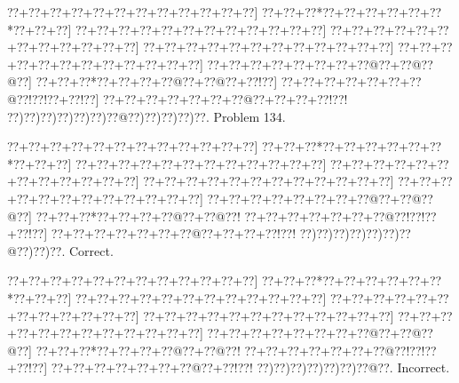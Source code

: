 \documentclass[a5paper]{article}
\begin{document}
\begin{center}
{\goo
\0??+\0??+\0??+\0??+\0??+\0??+\0??+\0??+\0??+\0??+\0??+\0??]
\0??+\0??+\0??*\0??+\0??+\0??+\0??+\0??+\0??*\0??+\0??+\0??]
\0??+\0??+\0??+\0??+\0??+\0??+\0??+\0??+\0??+\0??+\0??+\0??]
\0??+\0??+\0??+\0??+\0??+\0??+\0??+\0??+\0??+\0??+\0??+\0??]
\0??+\0??+\0??+\0??+\0??+\0??+\0??+\0??+\0??+\0??+\0??+\0??]
\0??+\0??+\0??+\0??+\0??+\0??+\0??+\0??+\0??+\0??+\0??+\0??]
\0??+\0??+\0??+\0??+\0??+\0??+\0??+\0??@\0??+\0??@\0??@\0??]
\0??+\0??+\0??*\0??+\0??+\0??+\0??@\0??+\0??@\0??+\0??!\0??]
\0??+\0??+\0??+\0??+\0??+\0??+\0??@\0??!\0??!\0??+\0??!\0??]
\0??+\0??+\0??+\0??+\0??+\0??+\0??@\0??+\0??+\0??+\0??!\0??!
\0??)\0??)\0??)\0??)\0??)\0??)\0??@\0??)\0??)\0??)\0??)\0??.
}
Problem 134.

\end{center}
\begin{center}
{\goo
\0??+\0??+\0??+\0??+\0??+\0??+\0??+\0??+\0??+\0??+\0??+\0??]
\0??+\0??+\0??*\0??+\0??+\0??+\0??+\0??+\0??*\0??+\0??+\0??]
\0??+\0??+\0??+\0??+\0??+\0??+\0??+\0??+\0??+\0??+\0??+\0??]
\0??+\0??+\0??+\0??+\0??+\0??+\0??+\0??+\0??+\0??+\0??+\0??]
\0??+\0??+\0??+\0??+\0??+\0??+\0??+\0??+\0??+\0??+\0??+\0??]
\0??+\0??+\0??+\0??+\0??+\0??+\0??+\0??+\0??+\0??+\0??+\0??]
\0??+\0??+\0??+\0??+\0??+\0??+\0??+\0??@\0??+\0??@\0??@\0??]
\0??+\0??+\0??*\0??+\0??+\0??+\0??@\0??+\0??@\0??!
\0??+\0??+\0??+\0??+\0??+\0??+\0??@\0??!\0??!\0??+\0??!\0??]
\0??+\0??+\0??+\0??+\0??+\0??+\0??@\0??+\0??+\0??+\0??!\0??!
\0??)\0??)\0??)\0??)\0??)\0??)\0??@\0??)\0??)\0??.
}
Correct. 

\end{center}
\begin{center}
{\goo
\0??+\0??+\0??+\0??+\0??+\0??+\0??+\0??+\0??+\0??+\0??+\0??]
\0??+\0??+\0??*\0??+\0??+\0??+\0??+\0??+\0??*\0??+\0??+\0??]
\0??+\0??+\0??+\0??+\0??+\0??+\0??+\0??+\0??+\0??+\0??+\0??]
\0??+\0??+\0??+\0??+\0??+\0??+\0??+\0??+\0??+\0??+\0??+\0??]
\0??+\0??+\0??+\0??+\0??+\0??+\0??+\0??+\0??+\0??+\0??+\0??]
\0??+\0??+\0??+\0??+\0??+\0??+\0??+\0??+\0??+\0??+\0??+\0??]
\0??+\0??+\0??+\0??+\0??+\0??+\0??+\0??@\0??+\0??@\0??@\0??]
\0??+\0??+\0??*\0??+\0??+\0??+\0??@\0??+\0??@\0??!
\0??+\0??+\0??+\0??+\0??+\0??+\0??@\0??!\0??!\0??+\0??!\0??]
\0??+\0??+\0??+\0??+\0??+\0??+\0??@\0??+\0??!\0??!
\0??)\0??)\0??)\0??)\0??)\0??)\0??@\0??.
}
Incorrect. 

\end{center}
\newpage
\end{document}
